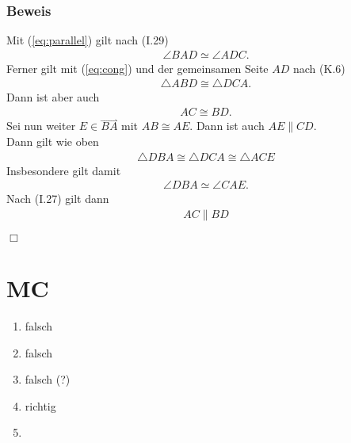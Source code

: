 \documentclass[11pt]{article}
\newcommand{\ray}[1]{\stackrel{\rightharpoonup}{#1}}
\begin{document}
\subsubsection*{Beweis}
Mit (\ref{eq:parallel}) gilt nach (I.29)
\begin{equation*}
\begin{aligned}
\angle BAD \simeq \angle ADC.
\end{aligned}
\end{equation*}
Ferner gilt mit (\ref{eq:cong}) und der gemeinsamen Seite $ AD $ nach (K.6)
\begin{equation*}
\begin{aligned}
\triangle ABD \cong \triangle DCA.
\end{aligned}
\end{equation*}
Dann ist aber auch
\begin{equation*}
\begin{aligned}
AC \cong BD.
\end{aligned}
\end{equation*}
Sei nun weiter $ E \in \ray{BA} $ mit $ AB \cong AE $. Dann ist auch $ AE \parallel CD $.\\
Dann gilt wie oben
\begin{equation*}
\begin{aligned}
\triangle DBA \cong \triangle DCA \cong \triangle ACE
\end{aligned}
\end{equation*}
Insbesondere gilt damit
\begin{equation*}
\begin{aligned}
\angle DBA \simeq \angle CAE.
\end{aligned}
\end{equation*}
Nach (I.27) gilt dann
\begin{equation*}
\begin{aligned}
AC \parallel BD
\end{aligned}
\end{equation*}
\begin{flushright}
	$ \Box $
\end{flushright}
\section*{MC}
\begin{enumerate}
	\item falsch
	\item falsch
	\item falsch (?)
	\item richtig
	\item 
\end{enumerate}
\end{document}
